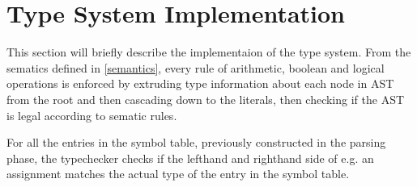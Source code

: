 \section{Type System Implementation}\label{TypSysImp}

This section will briefly describe the implementaion of the type system. From the sematics defined in \cref{semantics}, every rule of arithmetic, boolean and logical operations is enforced by extruding type information about each node in AST from the root and then cascading down to the literals, then checking if the AST is legal according to sematic rules.

For all the entries in the symbol table, previously constructed in the parsing phase, the typechecker checks if the lefthand and righthand side of e.g. an assignment matches the actual type of the entry in the symbol table.
